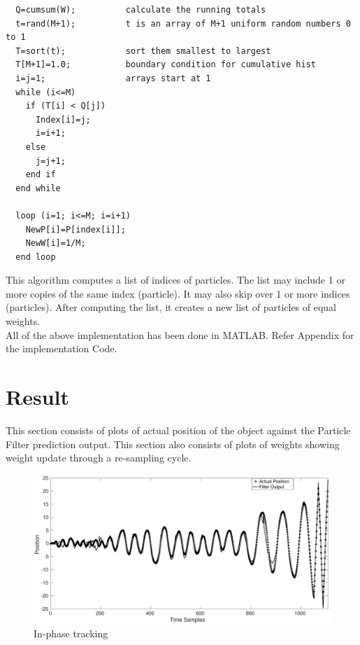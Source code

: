 \documentclass[12pt]{article}
\begin{document}
\begin{enumerate}
\begin{verbatim}
  Q=cumsum(W);          calculate the running totals  
  t=rand(M+1);          t is an array of M+1 uniform random numbers 0 to 1
  T=sort(t);            sort them smallest to largest
  T[M+1]=1.0;           boundary condition for cumulative hist
  i=j=1;                arrays start at 1
  while (i<=M)
    if (T[i] < Q[j])
      Index[i]=j;
      i=i+1;
    else
      j=j+1;
    end if
  end while

  loop (i=1; i<=M; i=i+1)
    NewP[i]=P[index[i]];
    NewW[i]=1/M;
  end loop
\end{verbatim}
	This algorithm computes a list of indices of particles. The list may include 1 or more copies of the same index (particle). It may also skip over 1 or more indices (particles). After computing the list, it creates a new list of particles of equal weights. \\
	
All of the above implementation has been done in MATLAB. Refer Appendix for the implementation Code. 
	
\end{enumerate}

\section{Result}
This section consists of plots of actual position of the object against the Particle Filter prediction output. This section also consists of plots of weights showing weight update through a re-sampling cycle. 

\begin{figure}[h]
\centering
	\includegraphics[scale = 0.2]{./Figures/inphase.eps}
	\caption{In-phase tracking}
	\label{fig:inphase}
\end{figure}
\end{document}
